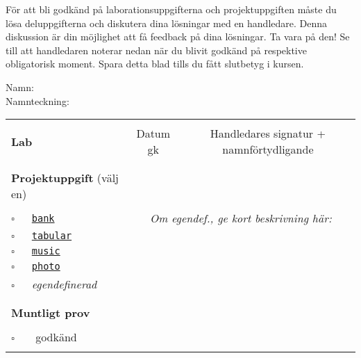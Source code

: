 \vspace{1em}\noindent
För att bli godkänd på laborationsuppgifterna och projektuppgiften måste du lösa deluppgifterna och diskutera dina lösningar med en handledare. Denna diskussion är din möjlighet att få feedback på dina lösningar. Ta vara på den!
Se till att handledaren noterar nedan när du blivit godkänd på respektive obligatorisk moment. Spara detta blad tills du fått slutbetyg i kursen.


\vspace{2.2em}\noindent Namn: \dotfill\\

\vspace{1em}\noindent Namnteckning: \dotfill\\

\newcommand{\LabRow}[1]{\\[-1.1em] \hyperref[section:lab:#1]{\texttt{#1}} & \dotfill &  \dotfill  \\[1em]}  %

\begin{table}[h]
\vspace{1em}
\begin{tabular}{lcc}
\hline%
\\
{\sffamily\bfseries\small Lab} & {\sffamily\small Datum gk} &	
{\sffamily\small Handledares signatur + namnförtydligande}\\ %
\\[-0.5em]

\\ 
{\sffamily\small {\bfseries Projektuppgift} (välj en)	} & \dotfill &  \dotfill  \\
\\
{\Large$\square$}\texttt{~~~\hyperref[section:proj:bank]{bank}} &
\multicolumn{2}{c}{\textit{Om egendef., ge kort beskrivning här:}}  \\[0.8em] %
{\Large$\square$}\texttt{~~~\hyperref[section:proj:tabular]{tabular}} \\[0.8em] %
{\Large$\square$}\texttt{~~~\hyperref[section:proj:music]{music}} \\[0.8em] %
{\Large$\square$}\texttt{~~~\hyperref[section:proj:photo]{photo}}  \\[0.8em] %
{\Large$\square$}\texttt{~~~}\textit{egendefinerad}  \\
\\
\\
{\sffamily\small {\bfseries Muntligt prov}} &  & \\
\\
{\Large$\square$}\texttt{~~~} godkänd & \dotfill &  \dotfill \\
\\\hline%
\end{tabular}
\end{table}
